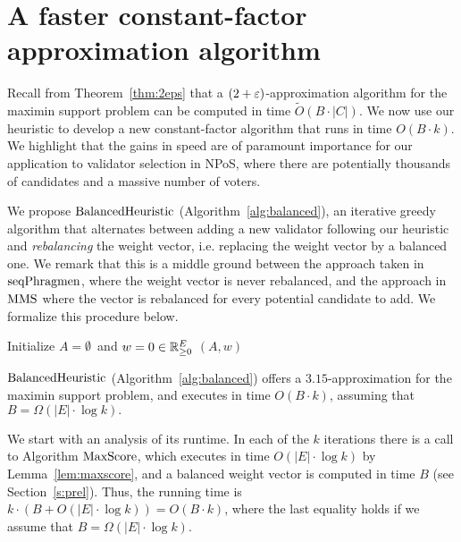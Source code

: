 \section{A faster constant-factor approximation algorithm}\label{s:315}

Recall from Theorem~\ref{thm:2eps} that a $(2+\varepsilon)$-approximation algorithm for the maximin support problem can be computed in time $\tilde{O}(B\cdot |C|)$. We now use our heuristic to develop a new constant-factor algorithm that runs in time $O(B\cdot k)$. We highlight that the gains in speed are of paramount importance for our application to validator selection in NPoS, where there are potentially thousands of candidates and a massive number of voters.

We propose $\balanced$ (Algorithm~\ref{alg:balanced}), an iterative greedy algorithm that alternates between adding a new validator following our heuristic and \emph{rebalancing} the weight vector, i.e. replacing the weight vector by a balanced one. We remark that this is a middle ground between the approach taken in $\operatorname{seqPhragmen}$, where the weight vector is never rebalanced, and the approach in $\operatorname{MMS}$ where the vector is rebalanced for every potential candidate to add. We formalize this procedure below.

\begin{algorithm}[htb]\label{alg:balanced}
\SetAlgoLined
{}
Initialize $A=\emptyset$\ and $w=0\in\mathbb{R}_{\geq 0}^E$\;
\Return $(A,w)$\;
\caption{$\balanced$}
\end{algorithm}

\begin{theorem}\label{thm:315}
$\balanced$ (Algorithm~\ref{alg:balanced}) offers a $3.15$-approximation for the maximin support problem, and executes in time $O(B\cdot k)$, assuming that $B= \Omega(|E|\cdot\log k).$
\end{theorem}

We start with an analysis of its runtime. In each of the $k$ iterations there is a call to Algorithm $\operatorname{MaxScore}$, which executes in time $O(|E|\cdot \log k)$ by Lemma~\ref{lem:maxscore}, and a balanced weight vector is computed in time $B$ (see Section~\ref{s:prel}). Thus, the running time is $k\cdot (B+O(|E|\cdot \log k))=O(B\cdot k)$, where the last equality holds if we assume that $B=\Omega(|E|\cdot \log k)$. 


